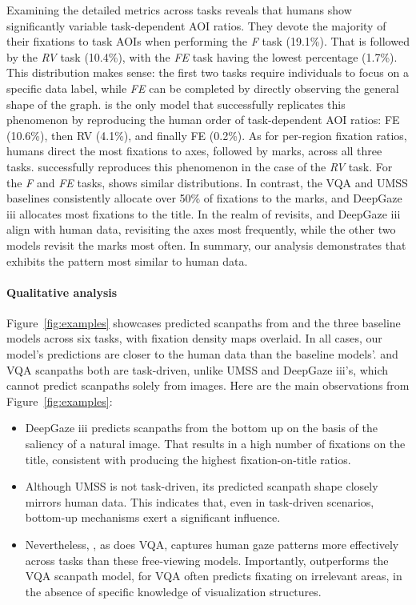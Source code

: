 Examining the detailed metrics across tasks reveals that humans show significantly variable task-dependent AOI ratios. They devote the majority of their fixations to task AOIs when performing the \textit{F} task (19.1\%). That is followed by the \textit{RV} task (10.4\%), with the \textit{FE} task having the lowest percentage (1.7\%). This distribution makes sense: the first two tasks require individuals to focus on a specific data label, while \textit{FE} can be completed by directly observing the general shape of the graph. \name is the only model that successfully replicates this phenomenon by reproducing the human order of task-dependent AOI ratios: {FE} (10.6\%), then {RV} (4.1\%), and finally {FE} (0.2\%). 
As for per-region fixation ratios, humans direct the most fixations to axes, followed by marks, across all three tasks. \name successfully reproduces this phenomenon in the case of the \textit{RV} task. For the \textit{F} and \textit{FE} tasks, \name shows similar distributions. In contrast, the VQA and UMSS baselines consistently allocate over 50\% of fixations to the marks, and DeepGaze iii allocates most fixations to the title. 
In the realm of revisits, \name and DeepGaze iii align with human data, revisiting the axes most frequently, while the other two models revisit the marks most often. 
In summary, our analysis demonstrates that \name exhibits the pattern most similar to human data.

\paragraph{Qualitative analysis}

Figure~\ref{fig:examples} showcases predicted scanpaths from \name and the three baseline models across six tasks, with fixation density maps overlaid. In all cases, our model's predictions are closer to the human data than the baseline models'. \name and VQA scanpaths both are task-driven, unlike UMSS and DeepGaze iii's, which cannot predict scanpaths solely from images. Here are the main observations from Figure~\ref{fig:examples}:
\begin{itemize}
    \item DeepGaze iii predicts scanpaths from the bottom up on the basis of the saliency of a natural image. That results in a high number of fixations on the title, consistent with producing the highest fixation-on-title ratios. 
    \item Although UMSS is not task-driven, its predicted scanpath shape closely mirrors human data. This indicates that, even in task-driven scenarios, bottom-up mechanisms exert a significant influence. 
    \item Nevertheless, \name, as does VQA, captures human gaze patterns more effectively across tasks than these free-viewing models. Importantly, \name outperforms the VQA scanpath model, for VQA often predicts fixating on irrelevant areas, in the absence of specific knowledge of visualization structures.
\end{itemize}

